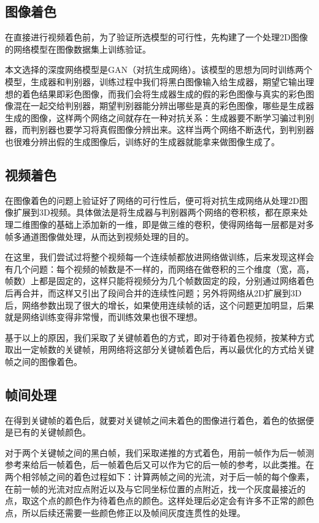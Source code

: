 \subsection{图像着色}
\label{sec:image-color}

  在直接进行视频着色前，为了验证所选模型的可行性，先构建了一个处理2D图像的网络模型在图像数据集上训练验证。

  本文选择的深度网络模型是GAN（对抗生成网络）。该模型的思想为同时训练两个模型，生成器和判别器，训练过程中我们将黑白图像输入给生成器，期望它输出理想的着色结果即彩色图像，而我们会将生成器生成的假的彩色图像与真实的彩色图像混在一起交给判别器，期望判别器能分辨出哪些是真的彩色图像，哪些是生成器生成的图像，这样两个网络之间就存在一种对抗关系：生成器要不断学习骗过判别器，而判别器也要学习将真假图像分辨出来。这样当两个网络不断迭代，到判别器也很难分辨出假的生成图像后，训练好的生成器就能拿来做图像生成了。

\subsection{视频着色}
\label{sec:video-color}

  在图像着色的问题上验证好了网络的可行性后，便可将对抗生成网络从处理2D图像扩展到3D视频。具体做法是将生成器与判别器两个网络的卷积核，都在原来处理二维图像的基础上添加新的一维，即是做三维的卷积，使得网络每一层都是对多帧多通道图像做处理，从而达到视频处理的目的。

  在这里，我们尝试过将整个视频每一个连续帧都放进网络做训练，后来发现这样会有几个问题：每个视频的帧数是不一样的，而网络在做卷积的三个维度（宽，高，帧数）上都是固定的，这样只能将视频分为几个帧数固定的段，分别通过网络着色后再合并，而这样又引出了段间合并的连续性问题；另外将网络从2D扩展到3D后，网络参数出现了很大的增长，如果使用连续帧的话，这个问题更加明显，后果就是网络训练变得非常慢，而训练效果也很不理想。

  基于以上的原因，我们采取了关键帧着色的方式，即对于待着色视频，按某种方式取出一定帧数的关键帧，用网络将这部分关键帧着色后，再以最优化的方式给关键帧之间的图像着色。

\subsection{帧间处理}
\label{sec:interframes}

  在得到关键帧的着色后，就要对关键帧之间未着色的图像进行着色，着色的依据便是已有的关键帧颜色。

  对于两个关键帧之间的黑白帧，我们采取递推的方式着色，用前一帧作为后一帧测参考来给后一帧着色，后一帧着色后又可以作为它的后一帧的参考，以此类推。在两个相邻帧之间的着色过程如下：计算两帧之间的光流，对于后一帧的每个像素，在前一帧的光流对应点附近以及与它同坐标位置的点附近，找一个灰度最接近的点，取这个点的颜色作为待着色点的颜色。这样处理后必定会有许多不正常的颜色点，所以后续还需要一些颜色修正以及帧间灰度连贯性的处理。

